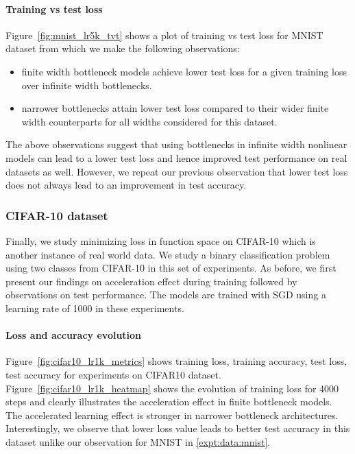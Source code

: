 \documentclass{article}
\theoremstyle{definition}
\theoremstyle{remark}
\renewcommand{\[}{\begin{eqnarray}}
\renewcommand{\]}{\end{eqnarray}}
\renewcommand{\[}{\begin{eqnarray}}
\renewcommand{\]}{\end{eqnarray}}
\begin{document}
\paragraph{Training vs test loss} Figure~\ref{fig:mnist_lr5k_tvt} shows a plot of training vs test loss for MNIST dataset from which we make the following observations:
\begin{itemize}
    \item finite width bottleneck models achieve lower test loss for a given training loss over infinite width bottlenecks.
    \item narrower bottlenecks attain lower test loss compared to their wider finite width counterparts for all widths considered for this dataset.
\end{itemize}
The above observations suggest that using bottlenecks in infinite width nonlinear models can lead to a lower test loss and hence improved test performance on real datasets as well. However, we repeat our previous observation that lower test loss does not always lead to an improvement in test accuracy. 

\subsubsection{CIFAR-10 dataset}
Finally, we study minimizing loss in function space on CIFAR-10 \cite{cifar} which is another instance of real world data. We study a binary classification problem using two classes from CIFAR-10 in this set of experiments. As before, we first present our findings on acceleration effect during training followed by observations on test performance. The models are trained with SGD using a learning rate of 1000 in these experiments.
\label{expt:data:cifar10}
\paragraph{Loss and accuracy evolution} Figure~\ref{fig:cifar10_lr1k_metrics} shows training loss, training accuracy, test loss, test accuracy for experiments on CIFAR10 dataset.  Figure~\ref{fig:cifar10_lr1k_heatmap} shows the evolution of training loss for 4000 steps and clearly illustrates the acceleration effect in finite bottleneck models. The accelerated learning effect is stronger in narrower bottleneck architectures. Interestingly, we observe that lower loss value leads to better test accuracy in this dataset unlike our observation for MNIST in \cref{expt:data:mnist}.
\end{document}
